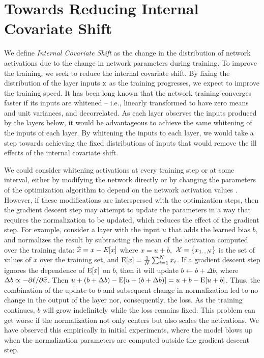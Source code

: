 \documentclass[twocolumn]{article}
\begin{document}
\section{Towards Reducing Internal \mbox{Covariate} Shift}

We define {\em Internal Covariate Shift} as
the change in the
distribution of network activations due to the change in network parameters during training.  To improve the
training, we seek to reduce the internal covariate shift.  By fixing
the distribution of the layer inputs $\mathrm{x}$ as the training progresses,
we expect to improve the training speed.
%
It has been long known \cite{lecun-backprop,
  loglinear-training}
that the network training converges faster if its inputs are whitened -- i.e.,
linearly transformed to have zero means and unit variances, and  decorrelated. As each layer
observes the inputs produced by the layers below, it would be advantageous to
achieve the same whitening of the inputs of each layer.  By whitening the
inputs to each layer, we would take a step towards achieving the fixed
distributions of inputs that would remove the ill effects of the internal covariate shift.


We could consider whitening activations at every training step or at
some interval, either by modifying the network directly or by changing
the parameters of the optimization algorithm to depend on the network
activation values \cite{mean-normalized-sgd, raiko, povey,
  desjardins}.  However, if these modifications are interspersed with
the optimization steps, then the gradient descent step may attempt to
update the parameters in a way that requires the normalization to be
updated, which reduces the effect of the gradient step. For example,
consider a layer with the input $u$ that adds the learned bias $b$,
and normalizes the result by subtracting the mean of the activation
computed over the training data: $\widehat{x}=x - E[x]$ where $x = u+b$,
\,$\mathcal{X}=\{x_{1\ldots N}\}$ is the set of values of $x$ over the
 training set, and $ \text{E}[x] = \frac{1}{N}\sum_{i=1}^N
x_i$. If  a gradient descent step ignores the dependence of $\text{E}[x]$  on $b$, then it  will
update $b\leftarrow b+\Delta b$, where $\Delta b\propto -\partial{\ell}/\partial{\widehat{x}}$. Then  $u+(b+\Delta b) -
\text{E}[u+(b+\Delta b)] =
u+b-\text{E}[u+b]$. Thus, the combination of the update to $b$ and subsequent change in
normalization led to no change in the output of the layer nor,
consequently, the loss. As the training continues, $b$ will grow
indefinitely while the loss remains fixed. This problem can get worse
if the normalization not only centers but also scales the activations.
We have observed this empirically in initial experiments, where the
model blows up when the normalization parameters are computed outside
the gradient descent step.
\end{document}
